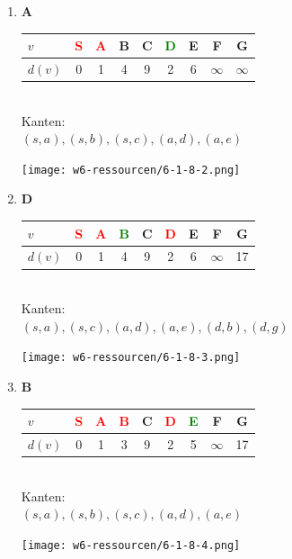 \documentclass{article}
\begin{document}
\begin{enumerate}
	\item \textbf{A}\\
	\begin{minipage}[t]{0.48\textwidth}
		\begin{tabular}{l||c|c|c|c|c|c|c|c}
			$v$		&	\textcolor{red}{S}	&	\textcolor{red}{A}	&	B	&	C	&	\textcolor{green}{D}	&	E	&	F	&	G	\\	\hline
			$d(v)$	&	0					&	1					&	4	&	9	&	2	&	6	&	$\infty$	&	$\infty$
		\end{tabular}\\
		Kanten:\\
		$(s,a),(s,b),(s,c),(a,d),(a,e)$
	\end{minipage}
	\begin{minipage}[t]{0.48\textwidth}
		\texttt{[image: w6-ressourcen/6-1-8-2.png]}
	\end{minipage}
	
	\item \textbf{D}\\
	\begin{minipage}[t]{0.48\textwidth}
		\begin{tabular}{l||c|c|c|c|c|c|c|c}
			$v$		&	\textcolor{red}{S}	&	\textcolor{red}{A}	&	\textcolor{green}{B}	&	C	&	\textcolor{red}{D}&	E	&	F	&	G	\\	\hline
			$d(v)$	&	0	&	1	&	4	&	9	&	2	&	6	&	$\infty$	&	17
		\end{tabular}\\
		Kanten:\\
		$(s,a),(s,c),(a,d),(a,e),(d,b),(d,g)$
	\end{minipage}
	\begin{minipage}[t]{0.48\textwidth}
		\texttt{[image: w6-ressourcen/6-1-8-3.png]}
	\end{minipage}
	
	\item \textbf{B}\\
	\begin{minipage}[t]{0.48\textwidth}
		\begin{tabular}{l||c|c|c|c|c|c|c|c}
			$v$		&	\textcolor{red}{S}	&	\textcolor{red}{A}	&	\textcolor{red}{B}	&	C	&	\textcolor{red}{D}	&	\textcolor{green}{E}	&	F	&	G	\\	\hline
			$d(v)$	&	0	&	1	&	3	&	9	&	2	&	5	&	$\infty$	&	17
		\end{tabular}\\
		Kanten:\\
		$(s,a),(s,b),(s,c),(a,d),(a,e)$
	\end{minipage}
	\begin{minipage}[t]{0.48\textwidth}
		\texttt{[image: w6-ressourcen/6-1-8-4.png]}
	\end{minipage}
	

\end{enumerate}
\end{document}
